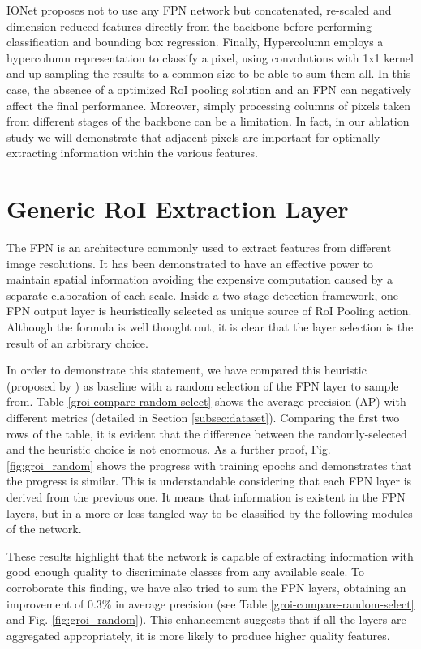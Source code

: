\documentclass[10pt,conference,a4paper]{IEEEtran}
\begin{document}
IONet \cite{bell2016inside} proposes not to use any FPN network but concatenated, re-scaled and dimension-reduced features directly from the backbone before performing classification and bounding box regression.
Finally, Hypercolumn \cite{hariharan2015hypercolumns} employs a hypercolumn representation to classify a pixel, using convolutions with 1x1 kernel and up-sampling the results to a common size to be able to sum them all.
In this case, the absence of a optimized RoI pooling solution and an FPN can negatively affect the final performance.
Moreover, simply processing columns of pixels taken from different stages of the backbone can be a limitation.
In fact, in our ablation study we will demonstrate that adjacent pixels are important for optimally extracting information within the various features.
 \section{Generic RoI Extraction Layer}
\label{generic_roi_extractor}

The FPN is an architecture commonly used to extract features from different image resolutions. It has been demonstrated to have an effective power to maintain spatial information avoiding the expensive computation caused by a separate elaboration of each scale.
Inside a two-stage detection framework, one FPN output layer is heuristically selected as unique source of RoI Pooling action.
Although the formula is well thought out, it is clear that the layer selection is the result of an arbitrary choice.

In order to demonstrate this statement, we have compared this heuristic (proposed by \cite{lin2017feature}) as baseline with a random selection of the FPN layer to sample from.
Table \ref{groi-compare-random-select} shows the average precision (AP) with different metrics (detailed in Section \ref{subsec:dataset}).
Comparing the first two rows of the table, it is evident that the difference between the randomly-selected and the heuristic choice is not enormous.
As a further proof, Fig. \ref{fig:groi_random} shows the progress with training epochs and demonstrates that the progress is similar.
This is understandable considering that each FPN layer is derived from the previous one.
It means that information is existent in the FPN layers, but in a more or less tangled way to be classified by the following modules of the network.

These results highlight that the network is capable of extracting information with good enough quality to discriminate classes from any available scale. To corroborate this finding, we have also tried to sum the FPN layers, obtaining an improvement of 0.3\% in average precision (see Table \ref{groi-compare-random-select} and Fig. \ref{fig:groi_random}).
This enhancement suggests that if all the layers are aggregated appropriately, it is more likely to produce higher quality features.
\end{document}
